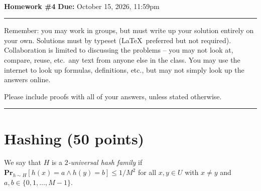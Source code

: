 \documentclass[11pt]{article}
\begin{document}
\\ 
{{\bf Homework \#4}} \hfill {{\bf Due:} October 15, 2026, 11:59pm} \\
\rule[0.1in]{\textwidth}{0.4pt}

Remember: you may work in groups, but must write up your solution entirely on your own.  Solutions must by typeset (\LaTeX\ preferred but not required). 
Collaboration is limited to discussing the problems -- you may not look at, compare, reuse, etc.~any text from anyone else in the class. 
You may use the internet to look up formulas, definitions, etc., but may not simply look up the answers online.  

Please include proofs with all of your answers, unless stated otherwise.

\noindent \rule[0.1in]{\textwidth}{0.4pt}

\section{Hashing (50 points)}

We say that $H$ is a \emph{$2$-universal hash family} if $\textbf{Pr}_{h \sim H}[h(x) = a \land h(y) = b] \leq 1/M^2$ for all $x,y \in U$ 
with $x \neq y$ and $a,b \in \{0,1,\dots,M-1\}$.  
\end{document}
